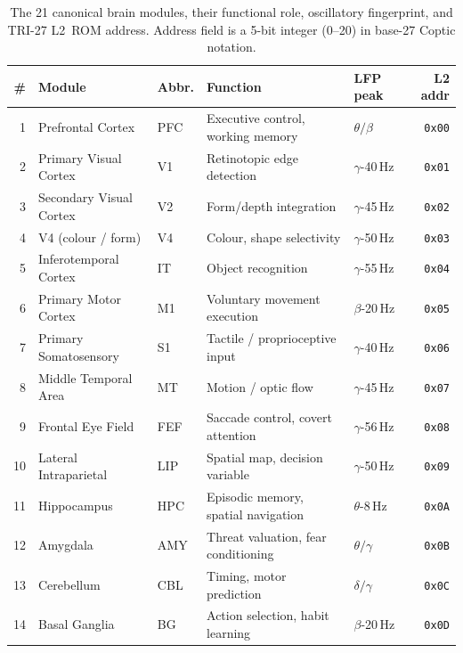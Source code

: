 \begin{table}[H]
\centering
\caption{The 21 canonical brain modules, their functional role,
         oscillatory fingerprint, and TRI-27 L2~ROM address.
         Address field is a 5-bit integer (0--20) in base-27
         Coptic notation.}
\label{tab:73:modules}
\small
\begin{tabular}{rllllr}
\toprule
\# & Module & Abbr. & Function & LFP peak & L2 addr \\
\midrule
 1 & Prefrontal Cortex          & PFC  & Executive control, working memory  & $\theta/\beta$       & \texttt{0x00} \\
 2 & Primary Visual Cortex      & V1   & Retinotopic edge detection          & $\gamma$-40\,Hz      & \texttt{0x01} \\
 3 & Secondary Visual Cortex    & V2   & Form/depth integration              & $\gamma$-45\,Hz      & \texttt{0x02} \\
 4 & V4 (colour / form)         & V4   & Colour, shape selectivity           & $\gamma$-50\,Hz      & \texttt{0x03} \\
 5 & Inferotemporal Cortex      & IT   & Object recognition                  & $\gamma$-55\,Hz      & \texttt{0x04} \\
 6 & Primary Motor Cortex       & M1   & Voluntary movement execution        & $\beta$-20\,Hz       & \texttt{0x05} \\
 7 & Primary Somatosensory      & S1   & Tactile / proprioceptive input      & $\gamma$-40\,Hz      & \texttt{0x06} \\
 8 & Middle Temporal Area       & MT   & Motion / optic flow                 & $\gamma$-45\,Hz      & \texttt{0x07} \\
 9 & Frontal Eye Field          & FEF  & Saccade control, covert attention   & $\gamma$-56\,Hz      & \texttt{0x08} \\
10 & Lateral Intraparietal      & LIP  & Spatial map, decision variable      & $\gamma$-50\,Hz      & \texttt{0x09} \\
11 & Hippocampus                & HPC  & Episodic memory, spatial navigation & $\theta$-8\,Hz       & \texttt{0x0A} \\
12 & Amygdala                   & AMY  & Threat valuation, fear conditioning & $\theta/\gamma$      & \texttt{0x0B} \\
13 & Cerebellum                 & CBL  & Timing, motor prediction            & $\delta/\gamma$      & \texttt{0x0C} \\
14 & Basal Ganglia              & BG   & Action selection, habit learning    & $\beta$-20\,Hz       & \texttt{0x0D} \\

\end{tabular}
\end{table}

